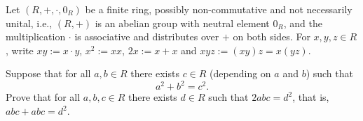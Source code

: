 %
\begin{problem}
    Let \( \left(R, +, \cdot, 0_R\right) \) be a finite ring, possibly non-commutative and not necessarily unital, i.e., \( \left(R, +\right) \) is an abelian group with neutral element \( 0_R \), and the multiplication \( \cdot \) is associative and distributes over \( + \) on both sides. For \( x, y, z \in R \), write \( xy := x \cdot y \), \( x^{2} := xx \), \( 2x := x + x \) and \( xyz := \left(xy\right)z = x\left(yz\right) \).

    Suppose that for all \( a, b \in R \) there exists \( c \in R \) (depending on \( a \) and \( b \)) such that
    \[
        a^{2} + b^{2} = c^{2}.
    \]
    Prove that for all \( a, b, c \in R \) there exists \( d \in R \) such that \( 2abc = d^{2} \), that is, \( abc + abc = d^{2} \).
\end{problem}
